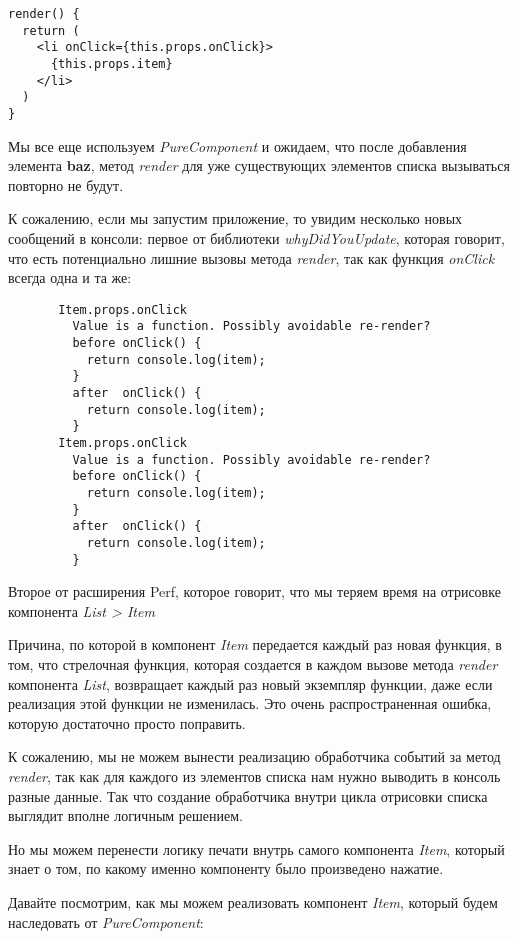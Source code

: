 \begin{lstlisting}
render() {
  return (
    <li onClick={this.props.onClick}>
      {this.props.item}
    </li>
  )
}
\end{lstlisting}

Мы все еще используем \textit{PureComponent} и ожидаем, что после добавления элемента \textbf{baz}, метод \textit{render} для уже существующих элементов списка вызываться повторно не будут.

К сожалению, если мы запустим приложение, то увидим несколько новых сообщений в консоли: первое от библиотеки \textit{whyDidYouUpdate}, которая говорит, что есть потенциально лишние вызовы метода \textit{render}, так как функция \textit{onClick} всегда одна и та же:

\begin{lstlisting}
       Item.props.onClick
         Value is a function. Possibly avoidable re-render?
         before onClick() {
           return console.log(item);
         }
         after  onClick() {
           return console.log(item);
         }
       Item.props.onClick
         Value is a function. Possibly avoidable re-render?
         before onClick() {
           return console.log(item);
         }
         after  onClick() {
           return console.log(item);
         }
\end{lstlisting}

Второе от расширения Perf, которое говорит, что мы теряем время на отрисовке компонента \textit{List > Item}

Причина, по которой в компонент \textit{Item} передается каждый раз новая функция, в том, что стрелочная функция, которая создается в каждом вызове метода \textit{render} компонента \textit{List}, возвращает каждый раз новый экземпляр функции, даже если реализация этой функции не изменилась. Это очень распространенная ошибка, которую достаточно просто поправить.

К сожалению, мы не можем вынести реализацию обработчика событий за метод \textit{render}, так как для каждого из элементов списка нам нужно выводить в консоль разные данные. Так что создание обработчика внутри цикла отрисовки списка выглядит вполне логичным решением.

Но мы можем перенести логику печати внутрь самого компонента \textit{Item}, который знает о том, по какому именно компоненту было произведено нажатие.

Давайте посмотрим, как мы можем реализовать компонент \textit{Item}, который будем наследовать от \textit{PureComponent}:

